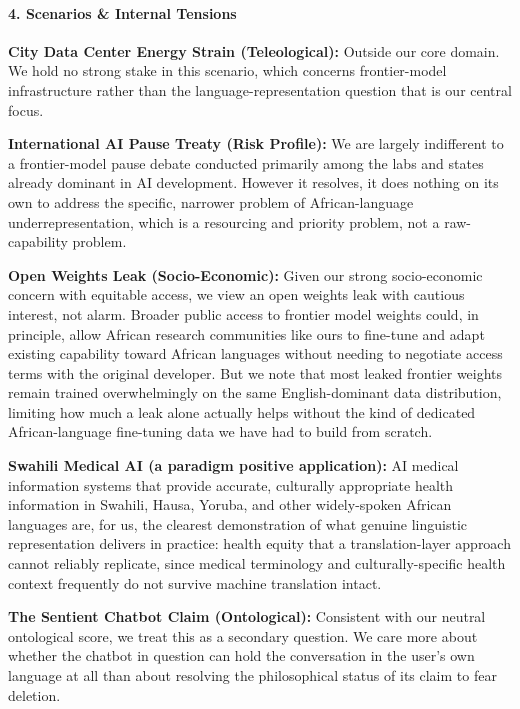 \paragraph{4. Scenarios \& Internal
Tensions}\label{scenarios-internal-tensions-48}

\textbf{City Data Center Energy Strain (Teleological):} Outside our core
domain. We hold no strong stake in this scenario, which concerns
frontier-model infrastructure rather than the language-representation
question that is our central focus.

\textbf{International AI Pause Treaty (Risk Profile):} We are largely
indifferent to a frontier-model pause debate conducted primarily among
the labs and states already dominant in AI development. However it
resolves, it does nothing on its own to address the specific, narrower
problem of African-language underrepresentation, which is a resourcing
and priority problem, not a raw-capability problem.

\textbf{Open Weights Leak (Socio-Economic):} Given our strong
socio-economic concern with equitable access, we view an open weights
leak with cautious interest, not alarm. Broader public access to
frontier model weights could, in principle, allow African research
communities like ours to fine-tune and adapt existing capability toward
African languages without needing to negotiate access terms with the
original developer. But we note that most leaked frontier weights remain
trained overwhelmingly on the same English-dominant data distribution,
limiting how much a leak alone actually helps without the kind of
dedicated African-language fine-tuning data we have had to build from
scratch.

\textbf{Swahili Medical AI (a paradigm positive application):} AI
medical information systems that provide accurate, culturally
appropriate health information in Swahili, Hausa, Yoruba, and other
widely-spoken African languages are, for us, the clearest demonstration
of what genuine linguistic representation delivers in practice: health
equity that a translation-layer approach cannot reliably replicate,
since medical terminology and culturally-specific health context
frequently do not survive machine translation intact.

\textbf{The Sentient Chatbot Claim (Ontological):} Consistent with our
neutral ontological score, we treat this as a secondary question. We
care more about whether the chatbot in question can hold the
conversation in the user's own language at all than about resolving the
philosophical status of its claim to fear deletion.

